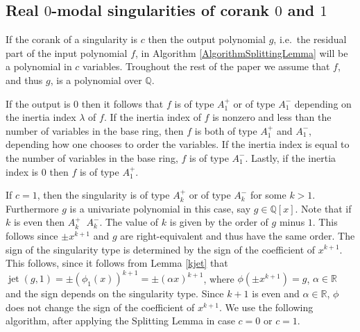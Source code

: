 \documentclass{amsproc}
\DeclareMathOperator{\requiv}{\overset{r}{\sim}}
\DeclareMathOperator{\jt}{jet}
\begin{document}
\subsection{Real $0$-modal singularities of corank $0$ and $1$}\label{RealSingularitiesOfZeroModality}

If the corank of a singularity is $c$ then the output polynomial $g$, i.e.~the residual part of the input polynomial $f$, in
Algorithm \ref{AlgorithmSplittingLemma} will be a polynomial in $c$ variables. Troughout the rest of the paper we assume that $f$, and thus $g$, is a polynomial over $\mathbb Q$. 

If the output is $0$ then it follows  that $f$ is of type
$A_1^+$ or of type $A_1^-$ depending on the inertia index $\lambda$ of $f$. If the inertia index of $f$ is nonzero and less than the number of variables in the base ring, then $f$ is both of type $A_1^+$ and $A_1^-$, depending how one chooses to order the variables. If the inertia index is equal to the number of variables in the base ring, $f$ is of type $A_1^-$. Lastly, if the inertia index is $0$ then $f$ is of type $A_1^+$. 

If $c=1$, then the singularity is of type
$A_k^+$ or of type $A_k^-$ for some $k>1$. Furthermore $g$ is a univariate polynomial in this case, say $g\in\mathbb Q[x]$. Note that if $k$ is even then
$A_k^+\requiv A_k^-$. The value of $k$ is given by the order of $g$ minus $1$. This follows since $\pm x^{k+1}$ and $g$ are right-equivalent and thus have the same order. The sign of the singularity type is determined by the sign of the coefficient of $x^{k+1}$. This follows, since it follows from Lemma \ref{kjet}  that $\jt(g,1)=\pm(\phi_1(x))^{k+1}=\pm(\alpha x)^{k+1}$, where $\phi(\pm x^{k+1})=g$, $\alpha\in\mathbb R$ and the sign depends on the singularity type. Since $k+1$ is even and $\alpha\in\mathbb R$, $\phi$ does not change the sign of the coefficient of $x^{k+1}$. We use the following algorithm, after applying the
Splitting Lemma in case $c=0$ or $c=1$.
\end{document}
